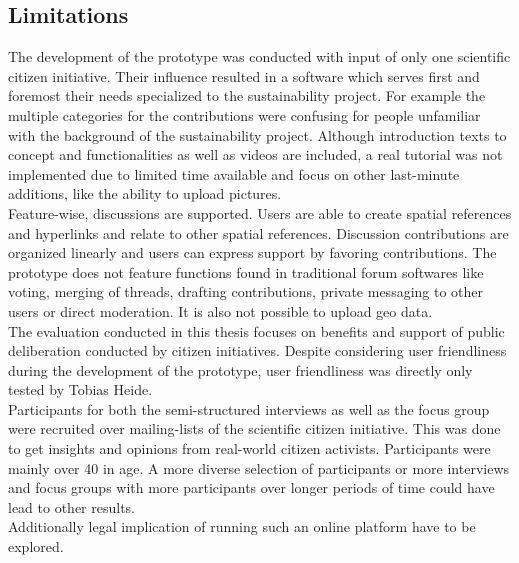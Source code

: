 \subsection{Limitations}
\label{sub:limitations}
The development of the prototype was conducted with input of only one scientific citizen initiative. Their influence resulted in a software which serves first and foremost their needs specialized to the sustainability project. For example the multiple categories for the contributions were confusing for people unfamiliar with the background of the sustainability project. Although introduction texts to concept and functionalities as well as videos are included, a real tutorial was not implemented due to limited time available and focus on other last-minute additions, like the ability to upload pictures.\\
Feature-wise, discussions are supported. Users are able to create spatial references and hyperlinks and relate to other spatial references. Discussion contributions are organized linearly and users can express support by favoring contributions. The prototype does not feature functions found in traditional forum softwares like voting, merging of threads, drafting contributions, private messaging to other users or direct moderation. It is also not possible to upload geo data.\\%
The evaluation conducted in this thesis focuses on benefits and support of public deliberation conducted by citizen initiatives. Despite considering user friendliness during the development of the prototype, user friendliness was directly only tested by Tobias Heide.\\
Participants for both the semi-structured interviews as well as the focus group were recruited over mailing-lists of the scientific citizen initiative. This was done to get insights and opinions from real-world citizen activists. Participants were mainly over 40 in age. A more diverse selection of participants or more interviews and focus groups with more participants over longer periods of time could have lead to other results.\\
Additionally legal implication of running such an online platform have to be explored.


